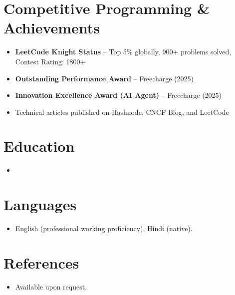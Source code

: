\documentclass[11pt,a4paper,sans]{moderncv}
\begin{document}

\section{Competitive Programming \& Achievements}
\vspace{1pt}
\begin{itemize}
\item{\textbf{LeetCode Knight Status} -- Top 5\% globally, 900+ problems solved, Contest Rating: 1800+}
\item{\textbf{Outstanding Performance Award} -- Freecharge (2025)}
\item{\textbf{Innovation Excellence Award (AI Agent)} -- Freecharge (2025)}
\item{Technical articles published on Hashnode, CNCF Blog, and LeetCode}
\end{itemize}


\section{Education}
\vspace{1pt}
\begin{itemize}

\item{}

\end{itemize}


\section{Languages}
\vspace{1pt}
\begin{itemize}
\item {English (professional working proficiency), Hindi (native).}
\end{itemize}


\section{References}
\vspace{1pt}
\begin{itemize}
\item{Available upon request.}
\end{itemize}
\end{document}

